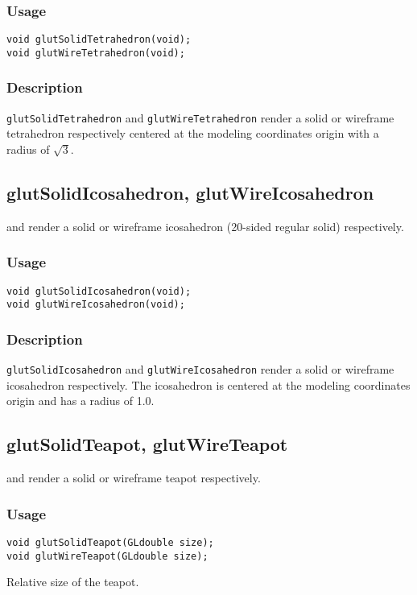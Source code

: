 \subsubsection*{Usage}
\begin{verbatim}
void glutSolidTetrahedron(void);
void glutWireTetrahedron(void);
\end{verbatim}

\subsubsection*{Description}

{\tt glutSolidTetrahedron} and {\tt glutWireTetrahedron} render a solid or wireframe
tetrahedron respectively centered at the modeling coordinates origin with a radius of $\sqrt{3}$.

\subsection{glutSolidIcosahedron, glutWireIcosahedron}

 and  render a solid or wireframe
icosahedron (20-sided regular solid) respectively.

\subsubsection*{Usage}
\begin{verbatim}
void glutSolidIcosahedron(void);
void glutWireIcosahedron(void);
\end{verbatim}

\subsubsection*{Description}


{\tt glutSolidIcosahedron} and {\tt glutWireIcosahedron} render a solid or wireframe
icosahedron respectively.  The icosahedron is centered at the modeling coordinates origin and has a radius
of 1.0.

\subsection{glutSolidTeapot, glutWireTeapot}

 and  render a solid or wireframe
teapot respectively.

\subsubsection*{Usage}
\begin{verbatim}
void glutSolidTeapot(GLdouble size);
void glutWireTeapot(GLdouble size);
\end{verbatim}
\begin{description}
\itemsep 0in
\item[\tt size] Relative size of the teapot.
\end{description}

